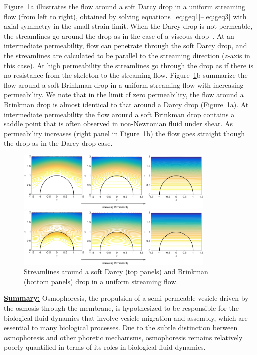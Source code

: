 \documentclass[11pt]{article}
\begin{document}
Figure~\ref{fig:DarcyDropUFlow0927}a illustrates the flow around a soft
Darcy drop in a uniform streaming flow (from left to right), obtained by
solving equations~\eqref{eq:geq1}--\eqref{eq:geq3} with axial symmetry
in the small-strain limit. When the Darcy drop is not permeable, the
streamlines go around the drop as in the case of a viscous
drop~\cite{DavisStone1993_CES, GLeal_AdvancedTransportPhenomena}. At an
intermediate permeability, flow can penetrate through the soft Darcy
drop, and the streamlines are calculated to be parallel to the streaming
direction ($z$-axis in this case). At high permeability the streamlines
go through the drop as if there is no resistance from the skeleton to
the streaming flow.  Figure~\ref{fig:DarcyDropUFlow0927}b summarize the
flow around a soft Brinkman drop in a uniform streaming flow with
increasing permeability.  We note that in the limit of zero
permeability, the flow around a Brinkman drop is almost identical to
that around a Darcy drop (Figure~\ref{fig:DarcyDropUFlow0927}a).  At
intermediate permeability the flow around a soft Brinkman drop contains
a saddle point that is often observed in non-Newtonian fluid under
shear.  As permeability increases (right panel in
Figure~\ref{fig:DarcyDropUFlow0927}b) the flow goes straight though the
drop as in the Darcy drop case.
%
\begin{figure}
\centerline{\includegraphics[width=3.75in]{figs/DarcyDropUFlow0927aa.pdf}}
\smallskip\par
\centerline{\includegraphics[width=3.75in]{figs/BrinkmanDropUFlow0927aa.pdf}}
\vspace{-7pt}
\caption{\label{fig:DarcyDropUFlow0927} Streamlines around a soft Darcy
  (top panels) and Brinkman (bottom panels) drop in a uniform streaming
  flow.}
\end{figure}
%

\noindent
\underline{{\bf Summary:}}
Osmophoresis, the propulsion of a semi-permeable vesicle driven by the
osmosis through the membrane, is hypothesized to be responsible for the
biological fluid dynamics that involve vesicle migration and assembly,
which are essential to many biological processes.  Due to the subtle
distinction between osmophoresis and other phoretic mechanisms,
osmophoresis remains relatively poorly quantified in terms of its roles
in biological fluid dynamics. 
\end{document}
